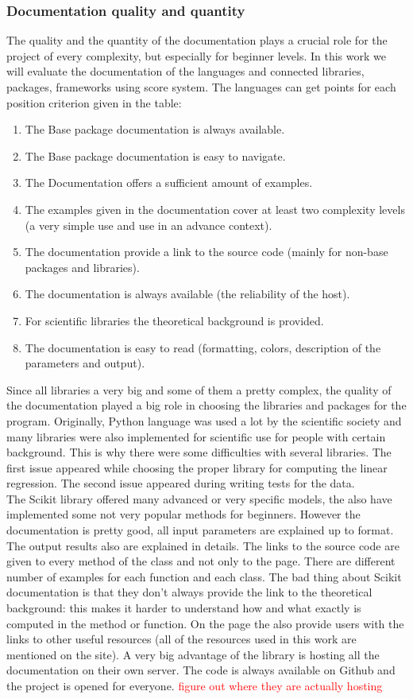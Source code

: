 \documentclass{article}
\begin{document}
\subsubsection{Documentation quality and quantity}
The quality and the quantity of the documentation plays a crucial role for the project of every complexity, but especially for beginner levels. In this work we will evaluate the documentation of the languages and connected libraries, packages, frameworks using score system. The languages can get points for each position criterion given in the table:
\begin{enumerate}
    \item The Base package documentation is always available.
    \item The Base package documentation is easy to navigate.
    \item The Documentation offers a sufficient amount of examples.
    \item The examples given in the documentation cover at least two complexity levels (a very simple use and use in an advance context).
    \item The documentation provide a link to the source code (mainly for non-base packages and libraries).
    \item The documentation is always available (the reliability of the host).
    \item For scientific libraries the theoretical background is provided.
    \item The documentation is easy to read (formatting, colors, description of the parameters and output).
\end{enumerate}
Since all libraries a very big and some of them a pretty complex, the quality of the documentation played a big role in choosing the libraries and packages for the program. Originally, Python language was used a lot by the scientific society and many libraries were also implemented for scientific use for people with certain background. This is why there were some difficulties with several libraries. The first issue appeared while choosing the proper library for computing the linear regression. The second issue appeared during writing tests for the data.\\
The Scikit library offered many advanced or very specific models, the also have implemented some not very popular methods for beginners. However the documentation is pretty good, all input parameters are explained up to format. The output results also are explained in details. The links to the source code are given to every method of the class and not only to the page. There are different number of examples for each function and each class. The bad thing about Scikit documentation is that they don't always provide the link to the theoretical background: this makes it harder to understand how and what exactly is computed in the method or function. On the page the also provide users with the links to other useful resources (all of the resources used in this work are mentioned on the site). A very big advantage of the library is hosting all the documentation on their own server. The code is always available on Github and the project is opened for everyone. \textcolor{red}{figure out where they are actually hosting}\\
\end{document}
